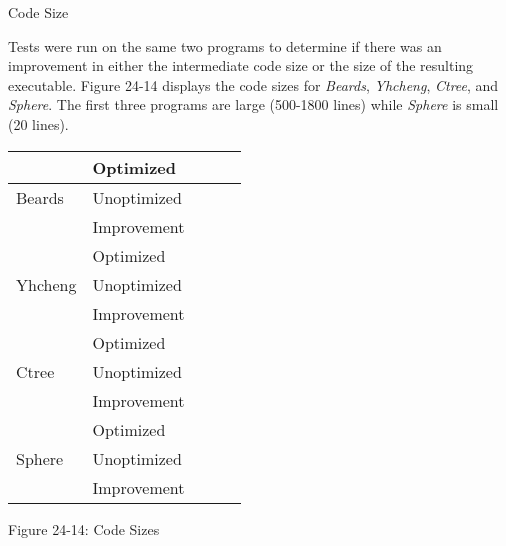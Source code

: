 {\sffamily
Code Size}

Tests were run on the same two programs to determine if there was an
improvement in either the intermediate code size or the size of the
resulting executable. Figure 24-14 displays the code sizes for
\textit{Beards}, \textit{Yhcheng}, \textit{Ctree}, and
\textit{Sphere}. The first three programs are large (500-1800 lines)
while \textit{Sphere} is small (20 lines).

\begin{center}
\tabletail{}
\tablelasttail{}
\begin{supertabular}{|m{1.1212599in}|m{1.1212599in}|m{1.1212599in}|m{1.1212599in}|m{1.1212599in}|}
\hline
~
 &
 Optimized &
 &
 &
\raggedleft{}\\\hline
 Beards &
 Unoptimized &
 &
 &
\raggedleft{}\\\hline
~
 &
 Improvement &
 &
 &
\raggedleft{}\\\hline
~
 &
 Optimized &
 &
 &
\raggedleft{}\\\hline
 Yhcheng &
 Unoptimized &
 &
 &
\raggedleft{}\\\hline
~
 &
 Improvement &
 &
 &
\raggedleft{}\\\hline
~
 &
 Optimized &
 &
 &
\raggedleft{}\\\hline
 Ctree &
 Unoptimized &
 &
 &
\raggedleft{}\\\hline
~
 &
 Improvement &
 &
 &
\raggedleft{}\\\hline
~
 &
 Optimized &
 &
 &
\raggedleft{}\\\hline
 Sphere &
 Unoptimized &
 &
 &
\raggedleft{}\\\hline
~
 &
 Improvement &
 &
 &
\raggedleft{}\\\hline
\end{supertabular}
\end{center}
{\centering{}
Figure 24-14: Code Sizes
\par}


